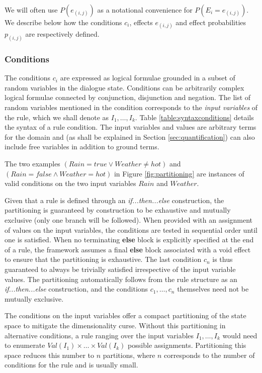 We will often use $P(e_{(i,j)})$ as a notational convenience for $P(E_i = e_{(i,j)})$.   We describe below how the conditions $c_i$, effects $e_{(i,j)}$ and effect probabilities $p_{(i,j)}$ are respectively defined. 

\subsubsection*{Conditions}

The conditions $c_i$ are expressed as logical formulae grounded in a subset of random variables in the dialogue state. Conditions can be arbitrarily complex logical formulae connected by conjunction, disjunction and negation.  The list of random variables mentioned in the condition corresponds to the \textit{input variables} of the rule, which we shall denote as $I_1, \dots, I_{k}$. Table \ref{table:syntaxconditions} details the syntax of a rule condition.  The input variables and values are arbitrary terms for the domain and (as shall be explained in Section \ref{sec:quantification}) can also include free variables in addition to ground terms. 

The two examples $(\mathit{Rain}\!=\mathit{true} \lor \mathit{Weather}\!\neq\mathit{hot})$ and $(\mathit{Rain}\!=\mathit{false} \land \mathit{Weather}\!=\mathit{hot})$ in Figure \ref{fig:partitioning} are instances of valid conditions on the two input variables $Rain$ and $\mathit{Weather}$. 

Given that a rule is defined through an \textit{if...then...else} construction, the partitioning is guaranteed by construction to be exhaustive and mutually exclusive (only one branch will be followed).  When provided with an assignment of values on the input variables, the conditions are tested in sequential order until one is satisfied. When no terminating \textbf{else} block is explicitly specified at the end of a rule, the framework assumes a final \textbf{else} block associated with a void effect to ensure that the partitioning is exhaustive. The last condition $c_n$ is thus guaranteed to always be trivially satisfied irrespective of the input variable values. The partitioning automatically follows from the rule structure as an \textit{if...then...else} construction, and the conditions $c_1,\dots, c_n$ themselves need not be mutually exclusive. 

The conditions on the input variables offer a compact partitioning of the state space to mitigate the dimensionality curse.  Without this partitioning in alternative conditions, a rule ranging over the input variables $I_1, \dots, I_{k}$ would need to enumerate $\mathit{Val}(I_1) \times \dots \times \mathit{Val}(I_k)$ possible assignments.  Partitioning this space reduces this number to $n$ partitions, where $n$ corresponds to the number of conditions for the rule and is usually small. 


